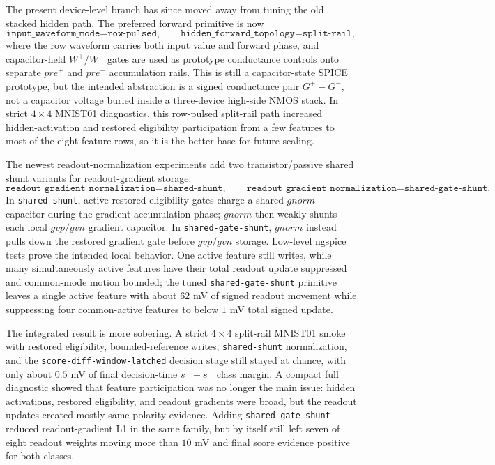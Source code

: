 \documentclass[11pt]{article}
\newcommand{\code}[1]{\texttt{#1}}
\begin{document}
The present device-level branch has since moved away from tuning the old
stacked hidden path.  The preferred forward primitive is now
\[
  \code{input\_waveform\_mode=row-pulsed},\qquad
  \code{hidden\_forward\_topology=split-rail},
\]
where the row waveform carries both input value and forward phase, and
capacitor-held \(W^+/W^-\) gates are used as prototype conductance controls
onto separate \(pre^+\) and \(pre^-\) accumulation rails.  This is still a
capacitor-state SPICE prototype, but the intended abstraction is a signed
conductance pair \(G^+-G^-\), not a capacitor voltage buried inside a
three-device high-side NMOS stack.  In strict \(4\times4\) MNIST01 diagnostics,
this row-pulsed split-rail path increased hidden-activation and restored
eligibility participation from a few features to most of the eight feature
rows, so it is the better base for future scaling.

The newest readout-normalization experiments add two transistor/passive shared
shunt variants for readout-gradient storage:
\[
  \code{readout\_gradient\_normalization=shared-shunt},\qquad
  \code{readout\_gradient\_normalization=shared-gate-shunt}.
\]
In \code{shared-shunt}, active restored eligibility gates charge a shared
\(gnorm\) capacitor during the gradient-accumulation phase; \(gnorm\) then
weakly shunts each local \(gvp/gvn\) gradient capacitor.  In
\code{shared-gate-shunt}, \(gnorm\) instead pulls down the restored gradient
gate before \(gvp/gvn\) storage.  Low-level ngspice tests prove the intended
local behavior.  One active feature still writes, while many simultaneously
active features have their total readout update suppressed and common-mode
motion bounded; the tuned \code{shared-gate-shunt} primitive leaves a single
active feature with about \(62\) mV of signed readout movement while
suppressing four common-active features to below \(1\) mV total signed update.

The integrated result is more sobering.  A strict \(4\times4\) split-rail
MNIST01 smoke with restored eligibility, bounded-reference writes,
\code{shared-shunt} normalization, and the
\code{score-diff-window-latched} decision stage still stayed at chance, with
only about \(0.5\) mV of final decision-time \(s^+-s^-\) class margin.  A
compact full diagnostic showed that feature participation was no longer the
main issue: hidden activations, restored eligibility, and readout gradients
were broad, but the readout updates created mostly same-polarity evidence.
Adding \code{shared-gate-shunt} reduced readout-gradient L1 in the same
family, but by itself still left seven of eight readout weights moving more
than \(10\) mV and final score evidence positive for both classes.
\end{document}
